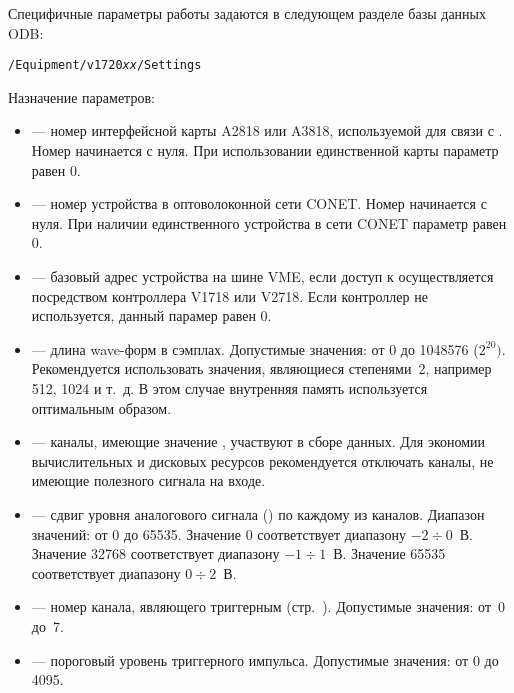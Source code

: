 Специфичные параметры работы \DEVICE{} задаются в следующем разделе базы данных ODB:

\medskip

{\tt /Equipment/v1720{\it xx}/Settings}

\medskip

Назначение параметров:

\begin{itemize}

\item {} --- номер интерфейсной карты A2818 или A3818, используемой для связи с \DEVICE{}. Номер начинается с нуля. При использовании единственной карты параметр равен 0.

\item {} --- номер устройства в оптоволоконной сети CONET. Номер начинается с нуля. При наличии единственного устройства в сети CONET параметр равен 0.

\item {} --- базовый адрес устройства на шине VME, если доступ к \DEVICE{} осуществляется посредством контроллера V1718 или V2718. Если контроллер не используется, данный парамер равен 0.

\item {} --- длина wave-форм в сэмплах. Допустимые значения: от 0 до 1048576 ($2^{20})$. Рекомендуется использовать значения, являющиеся степенями~2, например 512, 1024 и т.~д. В этом случае внутренняя память \DEVICE{} используется оптимальным образом.

\item {} --- каналы, имеющие значение , участвуют в сборе данных. Для экономии вычислительных и дисковых ресурсов рекомендуется отключать каналы, не имеющие полезного сигнала на входе.

\item {} --- сдвиг уровня аналогового сигнала () \cite{CaenUM3051AIS} по каждому из каналов. Диапазон значений: от 0 до 65535. Значение 0 соответствует диапазону $-2 \div 0$~В. Значение 32768 соответствует диапазону $-1 \div 1$~В. Значение 65535 соответствует диапазону $0 \div 2$~В. 

\item {} --- номер канала, являющего триггерным (стр.~\pageref{sec_basic}). Допустимые значения: от~0 до~7.

\item {} --- пороговый уровень триггерного импульса. Допустимые значения: от 0 до 4095.


\end{itemize}
